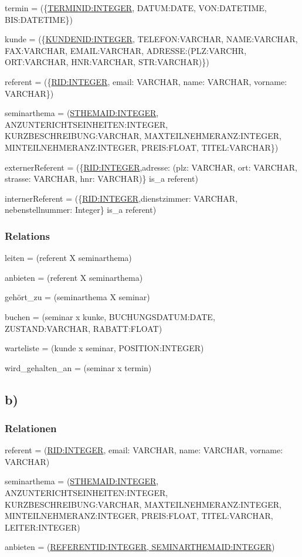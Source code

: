 \documentclass[10pt,a4paper]{report}
\begin{document}
termin  = (\{\underline{TERMINID:INTEGER}, DATUM:DATE, VON:DATETIME, BIS:DATETIME\})

kunde   = (\{\underline{KUNDENID:INTEGER}, TELEFON:VARCHAR, NAME:VARCHAR, FAX:VARCHAR, EMAIL:VARCHAR, ADRESSE:(PLZ:VARCHR, ORT:VARCHAR, HNR:VARCHAR, STR:VARCHAR)\})

referent = (\{\underline{RID:INTEGER}, email: VARCHAR, name: VARCHAR, vorname: VARCHAR\})

seminarthema = (\underline{STHEMAID:INTEGER}, ANZUNTERICHTSEINHEITEN:INTEGER, KURZBESCHREIBUNG:VARCHAR, MAXTEILNEHMERANZ:INTEGER, MINTEILNEHMERANZ:INTEGER, PREIS:FLOAT, TITEL:VARCHAR\})

externerReferent = (\{\underline{RID:INTEGER},adresse: (plz: VARCHAR, ort: VARCHAR, strasse: VARCHAR, hnr: VARCHAR)\} is\_a referent)

internerReferent = (\{\underline{RID:INTEGER},dienstzimmer: VARCHAR, nebenstellnummer: Integer\} is\_a referent)

\subsubsection{Relations}

leiten = (referent X seminarthema)

anbieten = (referent X seminarthema)

gehört\_zu = (seminarthema X seminar)

buchen = (seminar x kunke, BUCHUNGSDATUM:DATE, ZUSTAND:VARCHAR, RABATT:FLOAT)

warteliste = (kunde x seminar, POSITION:INTEGER)

wird\_gehalten\_an = (seminar x termin)


\subsection{b)}
\subsubsection{Relationen}
referent = (\underline{RID:INTEGER}, email: VARCHAR, name: VARCHAR, vorname: VARCHAR)

seminarthema = (\underline{STHEMAID:INTEGER}, ANZUNTERICHTSEINHEITEN:INTEGER, KURZBESCHREIBUNG:VARCHAR, MAXTEILNEHMERANZ:INTEGER, MINTEILNEHMERANZ:INTEGER, PREIS:FLOAT, TITEL:VARCHAR, LEITER:INTEGER)

anbieten = (\underline{REFERENTID:INTEGER, SEMINARTHEMAID:INTEGER})
\end{document}

